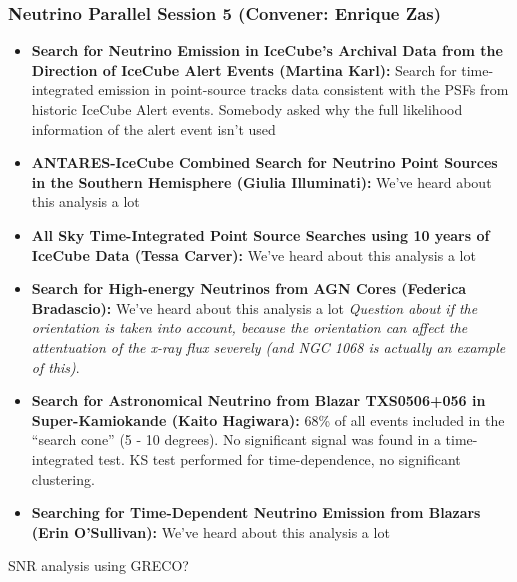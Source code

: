 \subsubsection{Neutrino Parallel Session 5 (Convener:   Enrique Zas)}
\begin{itemize}
    \item \textbf{ Search for Neutrino Emission in IceCube's Archival Data from the Direction of IceCube Alert Events (Martina Karl):} Search for time-integrated emission in point-source tracks data consistent with the PSFs from historic IceCube Alert events. Somebody asked why the full likelihood information of the alert event isn't used 
    \item \textbf{ ANTARES-IceCube Combined Search for Neutrino Point Sources in the Southern Hemisphere (Giulia Illuminati):} We've heard about this analysis a lot
    \item \textbf{All Sky Time-Integrated Point Source Searches using 10 years of IceCube Data (Tessa Carver):} We've heard about this analysis a lot
    \item \textbf{ Search for High-energy Neutrinos from AGN Cores (Federica Bradascio):} We've heard about this analysis a lot \textit{Question about if the orientation is taken into account, because the orientation can affect the attentuation of the x-ray flux severely (and NGC 1068 is actually an example of this)}.
    \item \textbf{ Search for Astronomical Neutrino from Blazar TXS0506+056 in Super-Kamiokande (Kaito Hagiwara):} 68\% of all events included in the ``search cone'' (5 - 10 degrees). No significant signal was found in a time-integrated test. KS test performed for time-dependence, no significant clustering.
    \item \textbf{Searching for Time-Dependent Neutrino Emission from Blazars (Erin O'Sullivan):} We've heard about this analysis a lot
\end{itemize}
SNR analysis using GRECO?

